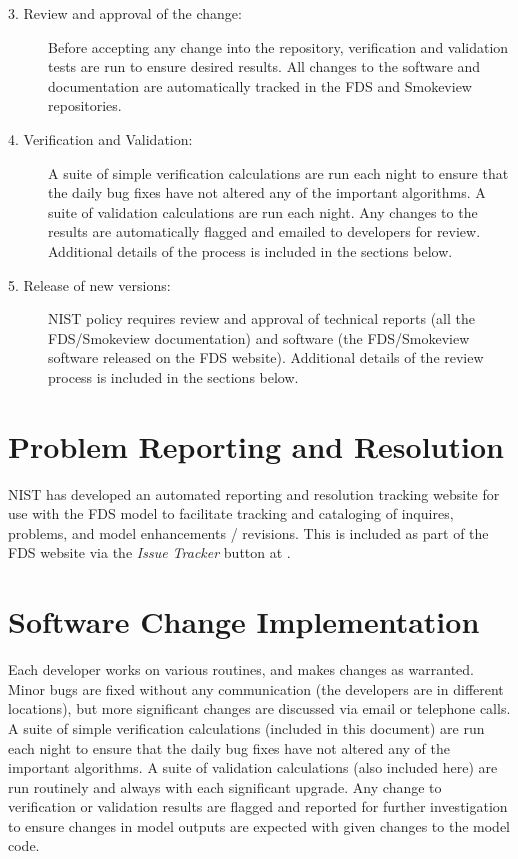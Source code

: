 \documentclass[11pt]{book}
\begin{document}
\begin{description}
\item [3. Review and approval of the change:] Before accepting any change into the repository, verification and validation tests are run to ensure desired results. All changes to the software and documentation are automatically tracked in the FDS and Smokeview repositories.
\item [4. Verification and Validation:] A suite of simple verification calculations are run each night to ensure that the daily bug fixes have not altered any of the important algorithms. A suite of validation calculations are run each night. Any changes to the results are automatically flagged and emailed to developers for review. Additional details of the process is included in the sections below.
\item [5. Release of new versions:] NIST policy requires review and approval of technical reports (all the FDS/Smokeview documentation) and software (the FDS/Smokeview software released on the FDS website). Additional details of the review process is included in the sections below.
\end{description}

\section{Problem Reporting and Resolution}

NIST has developed an automated reporting and resolution tracking website for use with the FDS model to facilitate tracking and cataloging of inquires, problems, and model enhancements / revisions. This is included as part of the FDS website via the \emph{Issue Tracker} button at \href{https://pages.nist.gov/fds/} {}.

\section{Software Change Implementation}

Each developer works on various routines, and makes changes as warranted. Minor bugs are fixed without any communication (the developers are in different locations), but more significant changes are discussed via email or telephone calls. A suite of simple verification calculations (included in this document) are run each night to ensure that the daily bug fixes have not altered any of the important algorithms. A suite of validation calculations (also included here) are run routinely and always with each significant upgrade. Any change to verification or validation results are flagged and reported for further investigation to ensure changes in model outputs are expected with given changes to the model code.
\end{document}
